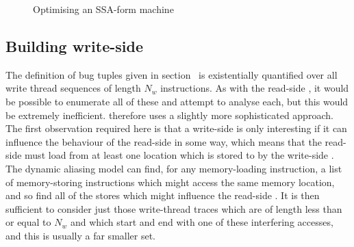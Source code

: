\begin{figure}
\caption{Optimising an SSA-form machine}
\label{fig:ssa_cfg1}
\end{figure}


\subsection{Building write-side \StateMachines}

The definition of bug tuples given in section~\needCite{} is
existentially quantified over all write thread sequences of length
$N_w$ instructions.  As with the read-side {\StateMachines}, it would
be possible to enumerate all of these and attempt to analyse each, but
this would be extremely inefficient.  {\Technique} therefore uses a
slightly more sophisticated approach.  The first observation required
here is that a write-side {\StateMachine} is only interesting if it
can influence the behaviour of the read-side {\StateMachine} in some
way, which means that the read-side {\StateMachine} must load from at
least one location which is stored to by the write-side
{\StateMachine}.  The dynamic aliasing model can find, for any
memory-loading instruction, a list of memory-storing instructions
which might access the same memory location, and so find all of the
stores which might influence the read-side {\StateMachine}.  It is
then sufficient to consider just those write-thread traces which are
of length less than or equal to $N_w$ and which start and end with one
of these interfering accesses, and this is usually a far smaller set.

